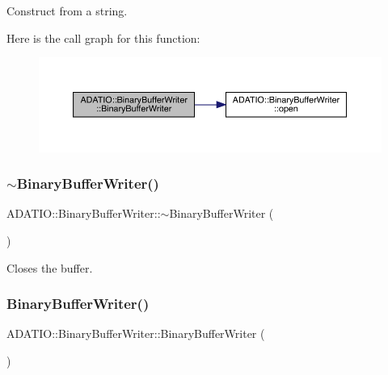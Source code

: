 Construct from a string. 

Here is the call graph for this function\+:\nopagebreak
\begin{figure}[H]
\begin{center}
\leavevmode
\includegraphics[width=350pt]{d8/d90/classADATIO_1_1BinaryBufferWriter_acdbd4afbd1fde21aff3ad80d3c67a43c_cgraph}
\end{center}
\end{figure}
\mbox{\label{classADATIO_1_1BinaryBufferWriter_a1d17b712ef50e475fe7e4acfe6642547}} 
\subsubsection{\texorpdfstring{$\sim$BinaryBufferWriter()}{~BinaryBufferWriter()}\hspace{0.1cm}{\footnotesize\ttfamily [1/3]}}
{\footnotesize\ttfamily A\+D\+A\+T\+I\+O\+::\+Binary\+Buffer\+Writer\+::$\sim$\+Binary\+Buffer\+Writer (\begin{DoxyParamCaption}{ }\end{DoxyParamCaption})}



Closes the buffer. 

\mbox{\label{classADATIO_1_1BinaryBufferWriter_a3812e6b5808e6349bae019f79d78094a}} 
\subsubsection{\texorpdfstring{BinaryBufferWriter()}{BinaryBufferWriter()}\hspace{0.1cm}{\footnotesize\ttfamily [3/6]}}
{\footnotesize\ttfamily A\+D\+A\+T\+I\+O\+::\+Binary\+Buffer\+Writer\+::\+Binary\+Buffer\+Writer (\begin{DoxyParamCaption}{ }\end{DoxyParamCaption})}

